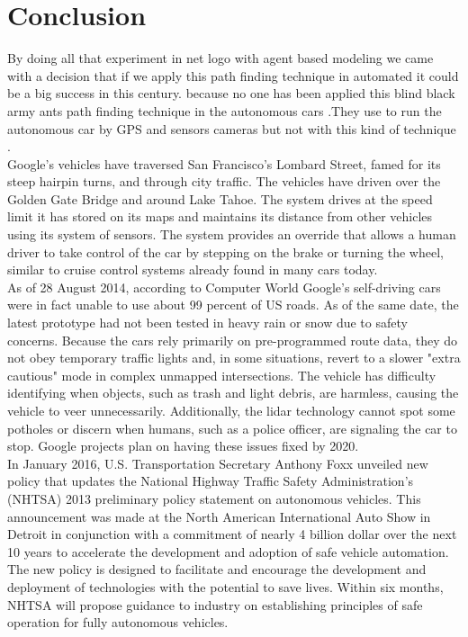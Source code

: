 \documentclass[conference]{IEEEtran}
\begin{document}
\section{Conclusion}
 By doing all that experiment in net logo with agent based modeling we came with a decision that if we apply this path finding technique in automated it could be a big success in this century. because no one has been applied this blind black army ants path finding technique in the autonomous cars .They use to run the autonomous car  by GPS and sensors cameras but not with this kind of technique .\\
Google's vehicles have traversed San Francisco's Lombard Street, famed for its steep hairpin turns, and through city traffic. The vehicles have driven over the Golden Gate Bridge and around Lake Tahoe. The system drives at the speed limit it has stored on its maps and maintains its distance from other vehicles using its system of sensors. The system provides an override that allows a human driver to take control of the car by stepping on the brake or turning the wheel, similar to cruise control systems already found in many cars today.\\
As of 28 August 2014, according to Computer World Google's self-driving cars were in fact unable to use about 99 percent of US roads. As of the same date, the latest prototype had not been tested in heavy rain or snow due to safety concerns. Because the cars rely primarily on pre-programmed route data, they do not obey temporary traffic lights and, in some situations, revert to a slower "extra cautious" mode in complex unmapped intersections. The vehicle has difficulty identifying when objects, such as trash and light debris, are harmless, causing the vehicle to veer unnecessarily. Additionally, the lidar technology cannot spot some potholes or discern when humans, such as a police officer, are signaling the car to stop. Google projects plan on having these issues fixed by 2020.\\
In January 2016, U.S. Transportation Secretary Anthony Foxx unveiled new policy that updates the National Highway Traffic Safety Administration's (NHTSA) 2013 preliminary policy statement on autonomous vehicles. This announcement was made at the North American International Auto Show in Detroit in conjunction with a commitment of nearly 4 billion dollar over the next 10 years to accelerate the development and adoption of safe vehicle automation. The new policy is designed to facilitate and encourage the development and deployment of technologies with the potential to save lives. Within six months, NHTSA will propose guidance to industry on establishing principles of safe operation for fully autonomous vehicles.\\
\end{document}
